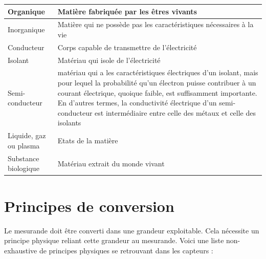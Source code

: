 \begin {center}
\begin{tabular}{|p{4.2cm}|p{9.5cm}|}
\hline
Organique &	Matière fabriquée par les êtres vivants \\
\hline
Inorganique &	Matière qui ne possède pas les caractéristiques nécessaires à la vie \\
\hline
Conducteur &	Corps capable de transmettre de l'électricité \\
\hline
Isolant &	Matériau qui isole de l'électricité \\
\hline
Semi-conducteur &	matériau qui a les caractéristiques électriques d'un isolant, mais pour lequel la probabilité qu'un électron puisse contribuer à un courant électrique, quoique faible, est suffisamment importante. En d'autres termes, la conductivité électrique d'un semi-conducteur est intermédiaire entre celle des métaux et celle des isolants \\
\hline
Liquide, gaz ou plasma &	Etats de la matière \\
\hline
Substance biologique &	Matériau extrait du monde vivant \\
\hline
\end{tabular}
\end{center}

\section{Principes de conversion}

Le mesurande doit être converti dans une grandeur exploitable. Cela nécessite un principe physique reliant cette grandeur au mesurande. Voici une liste non-exhaustive de principes physiques se retrouvant dans les capteurs :

